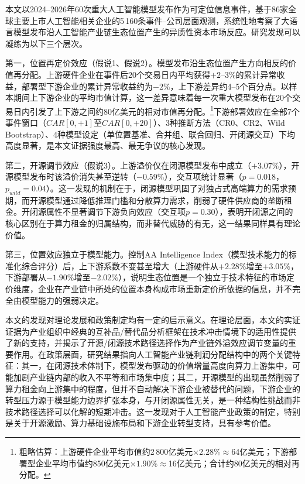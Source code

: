 \documentclass[11pt,fontset=fandol,a4paper]{ctexart}
\newcommand{\changed}[1]{#1}
\begin{document}
\changed{本文以2024--2026年60次重大人工智能模型发布作为可定位信息事件，基于86家全球主要上市人工智能相关企业的5\,160条事件--公司层面观测，系统性地考察了大语言模型发布沿人工智能产业链生态位置产生的异质性资本市场反应。研究发现可以凝练为以下三个层次。}

\changed{第一，位置再定价效应（假说1、假说2）。模型发布沿生态位置产生方向相反的价值再分配。上游硬件企业在事件后20个交易日内平均获得$+2$--$3\%$的累计异常收益，部署型下游企业的累计异常收益约为$-2\%$，上下游差异约4--5个百分点。以样本期间上下游企业的平均市值计算，这一差异意味着每一次重大模型发布在20个交易日内引发了上下游之间约80亿美元的相对市值再分配。\footnote{粗略估算：上游硬件企业平均市值约2\,800亿美元$\times 2.28\%\approx$64亿美元；下游部署型企业平均市值约850亿美元$\times 1.90\%\approx$16亿美元；合计约80亿美元的相对再分配。}下游部署效应在全部7个事件窗口（$CAR[0,+1]$至$CAR[0,+20]$）、3种推断方法（CR0、CR2、Wild Bootstrap）、4种模型设定（单位置基准、合并组、联合回归、开闭源交互）下均高度显著，是本文证据强度最高、最无争议的核心发现。}

第二，开源调节效应（假说3）。上游溢价仅在闭源模型发布中成立（$+3.07\%$），开源模型发布时该溢价消失甚至逆转（$-0.59\%$），交互项统计显著（$p=0.018$，$p_{wild}=0.04$）。这一发现的机制在于，闭源模型巩固了对独占式高端算力的需求预期，而开源模型通过降低推理门槛和分散算力需求，削弱了硬件供应商的垄断租金。开闭源属性不显著调节下游负向效应（交互项$p=0.30$），表明开闭源之间的核心区别在于算力租金的归属结构，而非替代威胁的有无，这一结果同样具有理论价值。

第三，位置效应独立于模型能力。控制AA Intelligence Index（模型技术能力的标准化综合评分）后，上下游系数不变甚至增大（上游硬件从$+2.28\%$增至$+3.05\%$，下游部署从$-1.90\%$增至$-2.02\%$），说明生态位置是一个独立于技术特征的市场定价维度，企业在产业链中所处的位置本身构成市场重新定价所依据的信息，并不完全由模型能力的强弱决定。

本文的发现对理论发展和政策制定均有一定的启示意义。在理论层面，本文的实证证据为产业组织中经典的互补品/替代品分析框架在技术冲击情境下的适用性提供了新的支持，并揭示了开源/闭源技术路径选择作为产业链外溢效应调节变量的重要作用。在政策层面，研究结果指向人工智能产业链利润分配结构中的两个关键特征：其一，在闭源技术体制下，模型发布驱动的价值增量高度向算力上游集中，可能加剧产业链内部的收入不平等和市场集中度；其二，开源模型的出现虽然削弱了算力租金向上游集中的程度，但并不自动解决下游企业被替代的问题，下游企业的转型压力源于模型能力边界扩张本身，与开闭源属性无关，是一种结构性挑战而非技术路径选择可以化解的短期冲击。这一发现对于人工智能产业政策的制定，特别是关于开源激励、算力基础设施布局和下游企业转型支持，具有参考价值。
\end{document}
